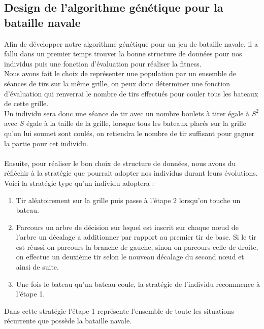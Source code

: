 \documentclass[12pt]{report}
\begin{document}
	\subsection{Design de l'algorithme génétique pour la bataille navale}
	Afin de développer notre algorithme génétique pour un jeu de bataille navale, il a fallu dans un premier temps trouver la bonne structure de données pour nos individus puis une fonction d'évaluation pour réaliser la fitness.\\
	Nous avons fait le choix de représenter une population par un ensemble de séances de tirs sur la même grille, on peux donc déterminer une fonction d'évaluation qui renverrai le nombre de tirs effectués pour couler tous les bateaux de cette grille.\\
	Un individu sera donc une séance de tir avec un nombre boulets à tirer égale à $S^2$ avec $S$ égale à la taille de la grille, lorsque tous les bateaux placés sur la grille qu'on lui soumet sont coulés, on retiendra le nombre de tir suffisant pour gagner la partie pour cet individu.\\\\
	Ensuite, pour réaliser le bon choix de structure de données, nous avons du réfléchir à la stratégie que pourrait adopter nos individus durant leurs évolutions. Voici la stratégie type qu'un individu adoptera :
	\begin{enumerate}
		\item Tir aléatoirement sur la grille puis passe à l'étape 2 lorsqu'on touche un bateau.
		\item Parcours un arbre de décision sur lequel est inscrit sur chaque nœud de l'arbre un décalage a additionner par rapport au premier tir de base. Si le tir est réussi on parcours la branche de gauche, sinon on parcours celle de droite, on effectue un deuxième tir selon le nouveau décalage du second nœud et ainsi de suite.
		\item Une fois le bateau qu'un bateau coule, la stratégie de l'individu recommence à l'étape 1.
	\end{enumerate}
	Dans cette stratégie l'étape 1 représente l'ensemble de toute les situations récurrente que possède la bataille navale.
\end{document}
